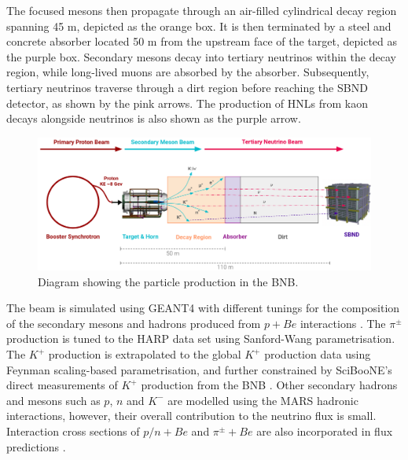 The focused mesons then propagate through an air-filled cylindrical decay region spanning 45 m, depicted as the orange box.
It is then terminated by a steel and concrete absorber located 50 m from the upstream face of the target, depicted as the purple box.
Secondary mesons decay into tertiary neutrinos within the decay region, while long-lived muons are absorbed by the absorber. 
Subsequently, tertiary neutrinos traverse through a dirt region before reaching the SBND detector, as shown by the pink arrows.
The production of HNLs from kaon decays alongside neutrinos is also shown as the purple arrow.

\begin{figure}[b!] 
\centering    
\includegraphics[width=1.0\textwidth]{BNBDiagram}
\caption[Particle Production in the BNB Diagram]{
Diagram showing the particle production in the BNB.
}
\label{fig:BNBDiagram}
\end{figure}

The beam is simulated using GEANT4 with different tunings for the composition of the secondary mesons and hadrons produced from $p + Be$ interactions \cite{BNBMiniBooNE}.
The $\pi^{\pm}$ production is tuned to the HARP data set using Sanford-Wang parametrisation.
The $K^{+}$ production is extrapolated to the global $K^{+}$ production data using Feynman scaling-based parametrisation, and further constrained by SciBooNE's direct measurements of $K^{+}$ production from the BNB \cite{SciBooNE}. 
Other secondary hadrons and mesons such as $p$, $n$ and $K^{-}$ are modelled using the MARS hadronic interactions, however, their overall contribution to the neutrino flux is small. 
Interaction cross sections of $p/n + Be$ and $\pi^{\pm} + Be$ are also incorporated in flux predictions \cite{DavePhd}.   

